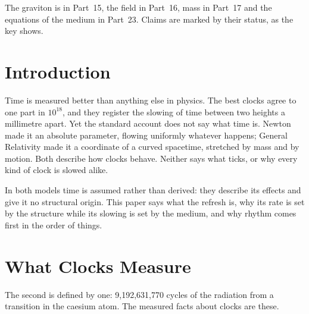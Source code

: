 \documentclass[11pt,a4paper]{article}
\begin{document}
The graviton is in Part~15, the field in Part~16, mass in Part~17 and the equations of the medium in Part~23. Claims are marked by their status, as the key shows.

\statuskey

\section*{Introduction}

Time is measured better than anything else in physics. The best clocks agree to one part in $10^{18}$, and they register the slowing of time between two heights a millimetre apart. Yet the standard account does not say what time is. Newton made it an absolute parameter, flowing uniformly whatever happens; General Relativity made it a coordinate of a curved spacetime, stretched by mass and by motion. Both describe how clocks behave. Neither says what ticks, or why every kind of clock is slowed alike.

In both models time is assumed rather than derived: they describe its effects and give it no structural origin.  This paper says what the refresh is, why its rate is set by the structure while its slowing is set by the medium, and why rhythm comes first in the order of things.

\section{What Clocks Measure}
\label{sec:measured}

 The second is defined by one: 9,192,631,770 cycles of the radiation from a transition in the caesium atom. The measured facts about clocks are these.
\end{document}
